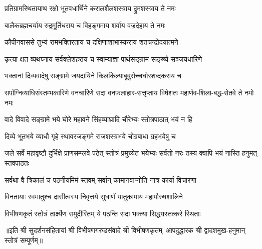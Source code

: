 \twolineshloka
{प्रतिग्रामस्थितायाथ रक्षो भूतवधार्थिने}
{करालशैलशस्त्राय द्रुमशस्त्राय ते नमः}

\twolineshloka
{बालैकब्रह्मचर्याय रुद्रमूर्तिधराय च}
{विहङ्गमाय शर्वाय वज्रदेहाय ते नमः}

\twolineshloka
{कौपीनवाससे तुभ्यं रामभक्तिरताय च}
{दक्षिणाशाभास्कराय शतचन्द्रोदयात्मने}

\twolineshloka
{कृत्या-क्षत-व्यथघ्नाय सर्वक्लेशहराय च}
{स्वाम्याज्ञा-पार्थसङ्ग्राम-सङ्ख्ये सञ्जयधारिणे}

\twolineshloka
{भक्तानां दिव्यवादेषु सङ्ग्रामे जयदायिने}
{किलकिल्याबूबुरोच्चघोरशब्दकराय च}

\threelineshloka
{सर्पाग्निव्याधिसंस्तम्भकारिणे वनचारिणे}
{सदा वनफलाहार-सत्तृप्ताय विषेशतः}
{महार्णव-शिला-बद्ध-सेतवे ते नमो नमः}

\twolineshloka
{वादे विवादे सङ्ग्रामे भये घोरे महावने}
{सिंहव्याघ्रादि चौरेभ्यः स्तोत्रपाठात् भयं न हि}

\twolineshloka
{दिव्ये भूतभये व्याधौ गृहे स्थावरजङ्गमे}
{राजशस्त्रभये चोग्रबाधा ग्रहभयेषु च}

\threelineshloka
{जले सर्वे महावृष्टौ दुर्भिक्षे प्राणसम्प्लवे}
{पठेत् स्तोत्रं प्रमुच्येत भयेभ्यः सर्वतो नरः}
{तस्य क्वापि भयं नास्ति हनुमत् स्तवपाठतः}

\twolineshloka
{सर्वथा वै त्रिकालं च पठनीयमिमं स्तवम्}
{सर्वान् कामानवाप्नोति नात्र कार्या विचारणा}

\twolineshloka
{विनतायाः स्वमातुश्च दासीत्वस्य निवृत्तये}
{सुधार्णं यातुकामाय महापौरुषशालिने}

\twolineshloka
{विभीषणकृतं स्तोत्रं तार्क्ष्येण समुदीरितम्}
{ये पठन्ति सदा भक्त्या सिद्धयस्तत्करे स्थिताः}

॥इति श्री सुदर्शनसंहितायां श्री विभीषणगरुडसंवादे श्री विभीषणकृतम्~आपदुद्धारक श्री द्वादशमुख-हनुमान् स्तोत्रं सम्पूर्णम्॥
